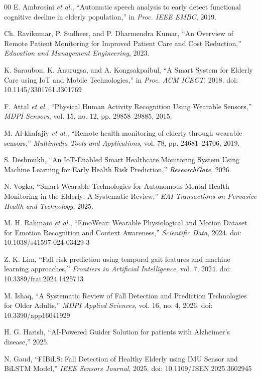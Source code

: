 \documentclass[conference]{IEEEtran}
\begin{document}
\begin{thebibliography}{00}
E. Ambrosini \textit{et al.}, ``Automatic speech analysis to early detect functional cognitive decline in elderly population,'' in \textit{Proc. IEEE EMBC}, 2019.

Ch. Ravikumar, P. Sudheer, and P. Dharmendra Kumar, ``An Overview of Remote Patient Monitoring for Improved Patient Care and Cost Reduction,'' \textit{Education and Management Engineering}, 2023.

K. Saraubon, K. Anurugsa, and A. Kongsakpaibul, ``A Smart System for Elderly Care using IoT and Mobile Technologies,'' in \textit{Proc. ACM ICECT}, 2018. doi: 10.1145/3301761.3301769

F. Attal \textit{et al.}, ``Physical Human Activity Recognition Using Wearable Sensors,'' \textit{MDPI Sensors}, vol. 15, no. 12, pp. 29858--29885, 2015.

M. Al-khafajiy \textit{et al.}, ``Remote health monitoring of elderly through wearable sensors,'' \textit{Multimedia Tools and Applications}, vol. 78, pp. 24681--24706, 2019.

S. Deshmukh, ``An IoT-Enabled Smart Healthcare Monitoring System Using Machine Learning for Early Health Risk Prediction,'' \textit{ResearchGate}, 2026.

N. Vogka, ``Smart Wearable Technologies for Autonomous Mental Health Monitoring in the Elderly: A Systematic Review,'' \textit{EAI Transactions on Pervasive Health and Technology}, 2025.

M. H. Rahmani \textit{et al.}, ``EmoWear: Wearable Physiological and Motion Dataset for Emotion Recognition and Context Awareness,'' \textit{Scientific Data}, 2024. doi: 10.1038/s41597-024-03429-3

Z. K. Lim, ``Fall risk prediction using temporal gait features and machine learning approaches,'' \textit{Frontiers in Artificial Intelligence}, vol. 7, 2024. doi: 10.3389/frai.2024.1425713

M. Ishaq, ``A Systematic Review of Fall Detection and Prediction Technologies for Older Adults,'' \textit{MDPI Applied Sciences}, vol. 16, no. 4, 2026. doi: 10.3390/app16041929

H. G. Harish, ``AI-Powered Guider Solution for patients with Alzheimer's disease,'' 2025.

N. Gaud, ``FIBiLS: Fall Detection of Healthy Elderly using IMU Sensor and BiLSTM Model,'' \textit{IEEE Sensors Journal}, 2025. doi: 10.1109/JSEN.2025.3602945


\end{thebibliography}
\end{document}
